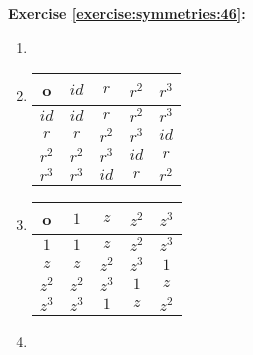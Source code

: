 \noindent\textbf{Exercise \ref{exercise:symmetries:46}:}
\begin{enumerate}[{a.}]
\item

\item 
\begin{tabular}{c| c c c c}
		o & $id$ & $r$ & $r^2$ & $r^3$\\
		\hline
		$id$ & $id$ & $r$ & $r^2$ & $r^3$\\
		$r$ & $r$ & $r^2$ & $r^3$ & $id$\\
		$r^2$ & $r^2$ & $r^3$ & $id$ & $r$\\
		$r^3$ & $r^3$ & $id$ & $r$ & $r^2$
	\end{tabular}
	
\item 
\begin{tabular}{c| c c c c}
		o & $1$ & $z$ & $z^2$ & $z^3$\\
		\hline
		$1$ & $1$ & $z$ & $z^2$ & $z^3$\\
		$z$ & $z$ & $z^2$ & $z^3$ & $1$\\
		$z^2$ & $z^2$ & $z^3$ & $1$ & $z$\\
		$z^3$ & $z^3$ & $1$ & $z$ & $z^2$
	\end{tabular}
	
\item
\end{enumerate}
